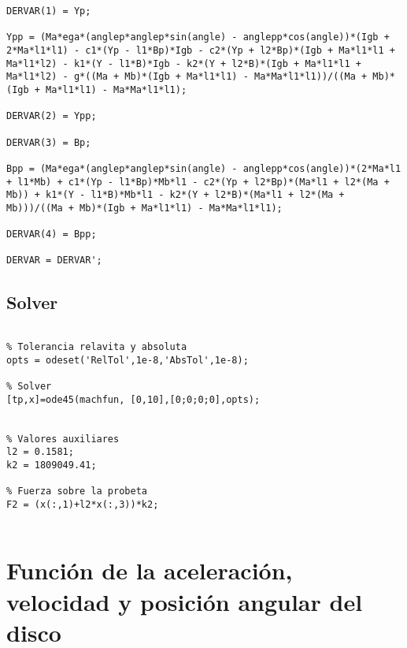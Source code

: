 \begin{lstlisting}
DERVAR(1) = Yp;

Ypp = (Ma*ega*(anglep*anglep*sin(angle) - anglepp*cos(angle))*(Igb + 2*Ma*l1*l1) - c1*(Yp - l1*Bp)*Igb - c2*(Yp + l2*Bp)*(Igb + Ma*l1*l1 + Ma*l1*l2) - k1*(Y - l1*B)*Igb - k2*(Y + l2*B)*(Igb + Ma*l1*l1 + Ma*l1*l2) - g*((Ma + Mb)*(Igb + Ma*l1*l1) - Ma*Ma*l1*l1))/((Ma + Mb)*(Igb + Ma*l1*l1) - Ma*Ma*l1*l1);

DERVAR(2) = Ypp;

DERVAR(3) = Bp;

Bpp = (Ma*ega*(anglep*anglep*sin(angle) - anglepp*cos(angle))*(2*Ma*l1 + l1*Mb) + c1*(Yp - l1*Bp)*Mb*l1 - c2*(Yp + l2*Bp)*(Ma*l1 + l2*(Ma + Mb)) + k1*(Y - l1*B)*Mb*l1 - k2*(Y + l2*B)*(Ma*l1 + l2*(Ma + Mb)))/((Ma + Mb)*(Igb + Ma*l1*l1) - Ma*Ma*l1*l1);

DERVAR(4) = Bpp;

DERVAR = DERVAR';

\end{lstlisting}


\subsection{Solver}
\begin{lstlisting}

% Tolerancia relavita y absoluta
opts = odeset('RelTol',1e-8,'AbsTol',1e-8);		

% Solver
[tp,x]=ode45(machfun, [0,10],[0;0;0;0],opts);


% Valores auxiliares
l2 = 0.1581;				
k2 = 1809049.41;			

% Fuerza sobre la probeta
F2 = (x(:,1)+l2*x(:,3))*k2;						


\end{lstlisting}

\section{Función de la aceleración, velocidad y posición angular del disco}

